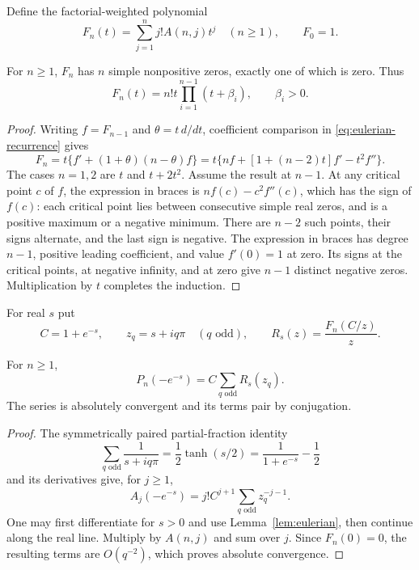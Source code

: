 Define the factorial-weighted polynomial
\[
F_n(t)=\sum_{j=1}^n j!A(n,j)t^j\quad(n\ge1),\qquad F_0=1.
\]
\begin{lemma}\label{lem:factorial}
For $n\ge1$, $F_n$ has $n$ simple nonpositive zeros, exactly one of which is zero. Thus
\begin{equation}\label{eq:factorial-factorization}
F_n(t)=n!t\prod_{i=1}^{n-1}(t+\beta_i),\qquad\beta_i>0.
\end{equation}
\end{lemma}
\begin{proof}
Writing $f=F_{n-1}$ and $\theta=t\,d/dt$, coefficient comparison in \eqref{eq:eulerian-recurrence} gives
\[
F_n=t\{f'+(1+\theta)(n-\theta)f\}
 =t\{nf+[1+(n-2)t]f'-t^2f''\}.
\]
The cases $n=1,2$ are $t$ and $t+2t^2$. Assume the result at $n-1$. At any critical point $c$ of $f$, the expression in braces is $nf(c)-c^2f''(c)$, which has the sign of $f(c)$: each critical point lies between consecutive simple real zeros, and is a positive maximum or a negative minimum. There are $n-2$ such points, their signs alternate, and the last sign is negative. The expression in braces has degree $n-1$, positive leading coefficient, and value $f'(0)=1$ at zero. Its signs at the critical points, at negative infinity, and at zero give $n-1$ distinct negative zeros. Multiplication by $t$ completes the induction.
\end{proof}

For real $s$ put
\[
C=1+e^{-s},\qquad z_q=s+iq\pi\quad(q\text{ odd}),\qquad
R_s(z)=\frac{F_n(C/z)}{z}.
\]
\begin{lemma}\label{lem:poles}
For $n\ge1$,
\begin{equation}\label{eq:pole-expansion}
P_n(-e^{-s})=C\sum_{q\text{ odd}}R_s(z_q).
\end{equation}
The series is absolutely convergent and its terms pair by conjugation.
\end{lemma}
\begin{proof}
The symmetrically paired partial-fraction identity
\[
\sum_{q\text{ odd}}\frac1{s+iq\pi}=\frac12\tanh(s/2)
 =\frac1{1+e^{-s}}-\frac12
\]
and its derivatives give, for $j\ge1$,
\[
A_j(-e^{-s})=j!C^{j+1}\sum_{q\text{ odd}}z_q^{-j-1}.
\]
One may first differentiate for $s>0$ and use Lemma~\ref{lem:eulerian}, then continue along the real line. Multiply by $A(n,j)$ and sum over $j$. Since $F_n(0)=0$, the resulting terms are $O(q^{-2})$, which proves absolute convergence.
\end{proof}

